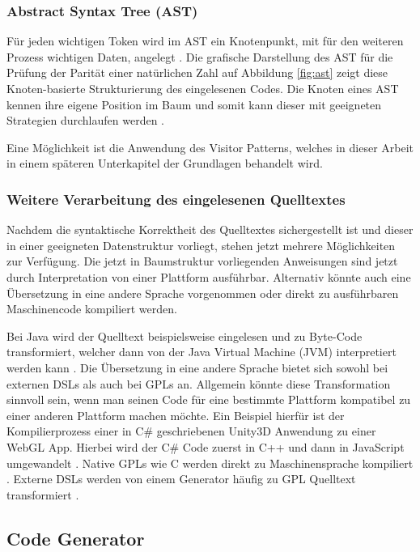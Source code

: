 \documentclass[12pt,oneside,a4paper,parskip]{scrbook}
\begin{document}
\subsubsection{Abstract Syntax Tree (AST)}

Für jeden wichtigen Token wird im AST ein Knotenpunkt, mit für den weiteren Prozess wichtigen Daten, angelegt \cite[S. 23]{parr2009}. Die grafische Darstellung  des AST für die Prüfung der Parität einer natürlichen Zahl auf Abbildung \ref{fig:ast} zeigt diese Knoten-basierte Strukturierung des eingelesenen Codes. Die Knoten eines AST kennen ihre eigene Position im Baum und somit kann dieser mit geeigneten Strategien durchlaufen werden \cite[S. 24]{parr2009}.

Eine Möglichkeit ist die Anwendung des Visitor Patterns, welches in dieser Arbeit in einem späteren Unterkapitel der Grundlagen behandelt wird.

\subsubsection{Weitere Verarbeitung des eingelesenen Quelltextes}

Nachdem die syntaktische Korrektheit des Quelltextes sichergestellt ist und dieser in einer geeigneten Datenstruktur vorliegt, stehen jetzt mehrere Möglichkeiten zur Verfügung. Die jetzt in Baumstruktur vorliegenden Anweisungen sind jetzt durch Interpretation von einer Plattform ausführbar. Alternativ könnte auch eine Übersetzung in eine andere Sprache vorgenommen oder direkt zu ausführbaren Maschinencode kompiliert werden.

Bei Java wird der Quelltext beispielsweise eingelesen und zu Byte-Code transformiert, welcher dann von der Java Virtual Machine (JVM) interpretiert werden kann \cite{javavm2014}. Die Übersetzung in eine andere Sprache bietet sich sowohl bei externen DSLs als auch bei GPLs an. Allgemein könnte diese Transformation sinnvoll sein, wenn man seinen Code für eine bestimmte Plattform kompatibel zu einer anderen Plattform machen möchte. Ein Beispiel hierfür ist der Kompilierprozess einer in C\# geschriebenen Unity3D Anwendung zu einer WebGL App. Hierbei wird der C\# Code zuerst in C++ und dann in JavaScript umgewandelt \cite{unity2018}. Native GPLs wie C werden direkt zu Maschinensprache kompiliert \cite{kernighan1988}. Externe DSLs werden von einem Generator häufig zu GPL Quelltext transformiert \cite[S. 26]{voelter2013}.

\subsection{Code Generator}
\end{document}
